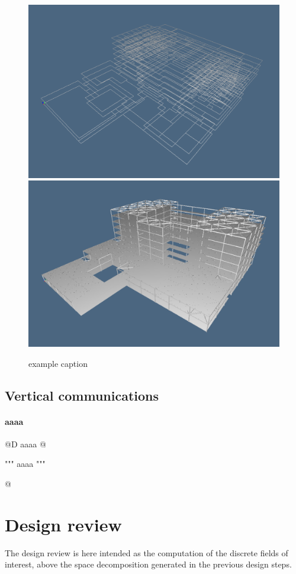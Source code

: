 \documentclass[11pt,oneside]{article}    %
\begin{document}
\begin{figure}[htbp] %
   \centering
   \includegraphics[height=0.35\linewidth,width=0.495\linewidth]{images/floor3D} 
   \includegraphics[height=0.35\linewidth,width=0.495\linewidth]{images/floor3Da} 
   \caption{example caption}
   \label{fig:example}
\end{figure}



\subsection{Vertical communications}


\paragraph{aaaa}
@D aaaa
@{""" aaaa """

@}

\section{Design review}

The design review is here intended as the computation of the discrete fields of interest,
above the space decomposition generated in the previous design steps. 
\end{document}

